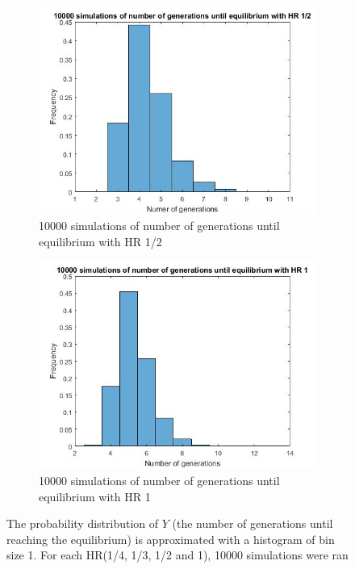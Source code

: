 \begin{figure}[ht]
\begin{subfigure}[t]{0.4\textwidth}
        \label{fig:tiger}
    \end{subfigure}
    ~ %
    \begin{subfigure}[t]{0.4\textwidth}
        \includegraphics[width=\textwidth]{GenormHistogramAantalgen2}
        \caption{10000 simulations of number of generations until equilibrium with HR 1/2}
        \label{minimal happiness 1}
    \end{subfigure}
    \begin{subfigure}[t]{0.4\textwidth}
        \includegraphics[width=\textwidth]{GenormHistogramAantalgen1}
        \caption{10000 simulations of number of generations until equilibrium with HR 1}
        \label{minimal happiness 1}
    \end{subfigure}
    \caption{The probability distribution of $Y$ (the number of generations until reaching the equilibrium) is approximated with a histogram of bin size 1. For each HR(1/4, 1/3, 1/2 and 1), 10000 simulations were ran}\label{fig:histogram}
\end{figure}
